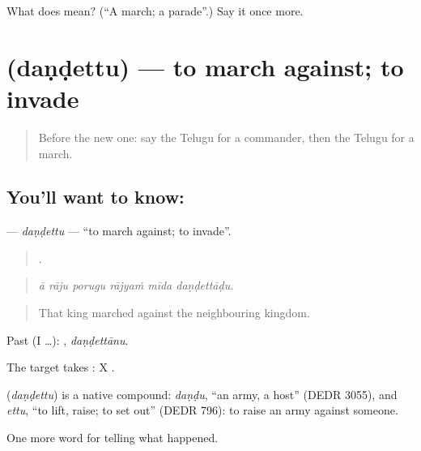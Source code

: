 \begin{tcolorbox}[breakable,colback=teal!4,colframe=teal!35!black,title={Before you move on}]
What does  mean? (\textquotedblleft{}A march; a parade\textquotedblright{}.) Say it once more.
\end{tcolorbox}
\section[\texorpdfstring{\te{దండెత్తు} (daṇḍettu)}{దండెత్తు (daṇḍettu)}]{ (daṇḍettu) — to march against; to invade}

\label{lesson:TE-C339-dandettu}



\begin{quote}
Before the new one: say the Telugu for a commander, then the Telugu for a march.
\end{quote}

\subsection*{You'll want to know: }
\textbf{} — \emph{daṇḍettu} — \textquotedblleft{}to march against; to invade\textquotedblright{}.

\begin{quote}
     .
\end{quote}

\begin{quote}
\emph{ā rāju porugu rājyaṁ mīda daṇḍettāḍu.}
\end{quote}

\begin{quote}
That king marched against the neighbouring kingdom.
\end{quote}

Past (I …): , \emph{daṇḍettānu}.

The target takes : X  .

\begin{cousinweb}
\textbf{} (\emph{daṇḍettu}) is a native compound: \emph{daṇḍu}, \textquotedblleft{}an army, a host\textquotedblright{} (DEDR 3055), and \emph{ettu}, \textquotedblleft{}to lift, raise; to set out\textquotedblright{} (DEDR 796): to raise an army against someone.
\end{cousinweb}

\begin{grammarlens}[title={What you've built}]
One more word for telling what happened.
\end{grammarlens}

